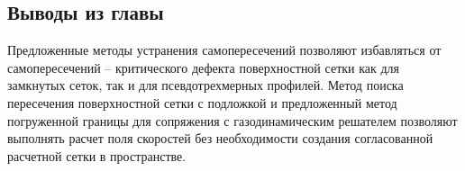
\subsection{Выводы из главы}

Предложенные методы устранения самопересечений позволяют избавляться от самопересечений -- критического дефекта поверхностной сетки как для замкнутых сеток, так и для псевдотрехмерных профилей.
Метод поиска пересечения поверхностной сетки с подложкой и предложенный метод погруженной границы для сопряжения с газодинамическим решателем позволяют выполнять расчет поля скоростей без необходимости создания согласованной расчетной сетки в пространстве.

